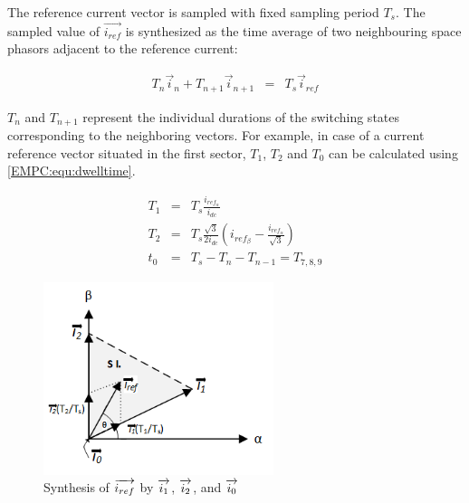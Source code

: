     The reference current vector is sampled with fixed sampling period $T_s$. The sampled value of $\overrightarrow{i_{ref}}$ is synthesized as the time average of two neighbouring space phasors adjacent to the reference current:

    \begin{equation}
        \begin{array}{rcl}
            T_n\vec{i}_n+T_{n+1}\vec{i}_{n+1}&=&T_s\vec{i}_{ref}
        \end{array}
        \label{EMPC:equ:i_ref}
    \end{equation}

    $T_n$ and $T_{n+1}$ represent the individual durations of the switching states corresponding to the neighboring vectors. For example, in case of a current reference vector situated in the first sector, $T_1$, $T_2$ and $T_0$ can be calculated using \ref{EMPC:equ:dwelltime}.

    \begin{equation}
        \begin{array}{rcl}
            T_1&=&T_s\frac{i_{ref_\alpha}}{i_{dc}}\\
            T_2&=&T_s\frac{\sqrt{3}}{2i_{dc}}(i_{ref_\beta}-\frac{i_{ref_\alpha}}{\sqrt{3}})\\
            t_0&=&T_s-T_n-T_{n-1}=T_{7,8,9}
        \end{array}
        \label{EMPC:equ:dwelltime}
    \end{equation}

    \begin{figure}[!ht]
        \centering
        \includegraphics[width=0.6\textwidth]{EMPC_PNG_Pics/OnePhasor.png}
        \caption{Synthesis of $\protect\overrightarrow{i_{ref}}$ by $\protect\overrightarrow{i_{1}}$, $\protect\overrightarrow{i_{2}}$, and $\protect\overrightarrow{i_{0}}$}
        \label{EMPC:fig:OnePhasor}
    \end{figure}

